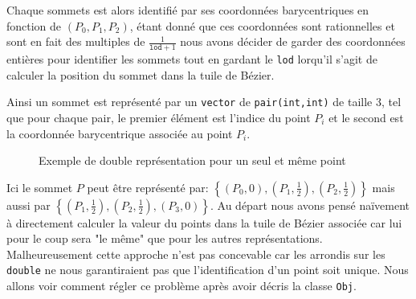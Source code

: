 \documentclass{article}
\begin{document}
Chaque sommets est alors identifié par ses coordonnées barycentriques en fonction de $(P_{0},P_{1},P_{2})$, étant donné que ces coordonnées sont rationnelles et sont en fait des multiples de $\frac{1}{\texttt{lod}+1}$ nous avons décider de garder des coordonnées entières pour identifier les sommets tout en gardant le \texttt{lod} lorqu'il s'agit de calculer la position du sommet dans la tuile de Bézier.

Ainsi un sommet est représenté par un \texttt{vector} de \texttt{pair(int,int)} de taille 3, tel que pour chaque pair, le premier élément est l'indice du point $P_{i}$ et le second est la coordonnée barycentrique associée au point $P_{i}$.
\begin{figure}[H]
\centering
{}
\caption{Exemple de double représentation pour un seul et même point}
\label{fig:doublerepr}
\end{figure}

Ici le sommet $P$ peut être représenté par: $\left\{(P_{0},0),(P_{1},\frac{1}{2}),(P_{2},\frac{1}{2})\right\}$ mais aussi par $\left\{(P_{1},\frac{1}{2}),(P_{2},\frac{1}{2}),(P_{3},0)\right\}$. Au départ nous avons pensé naïvement à directement calculer la valeur du points dans la tuile de Bézier associée car lui pour le coup sera "le même" que pour les autres représentations. Malheureusement cette approche n'est pas concevable car les arrondis sur les \texttt{double} ne nous garantiraient pas que l'identification d'un point soit unique. Nous allons voir comment régler ce problème après avoir décris la classe \texttt{Obj}.
\end{document}

